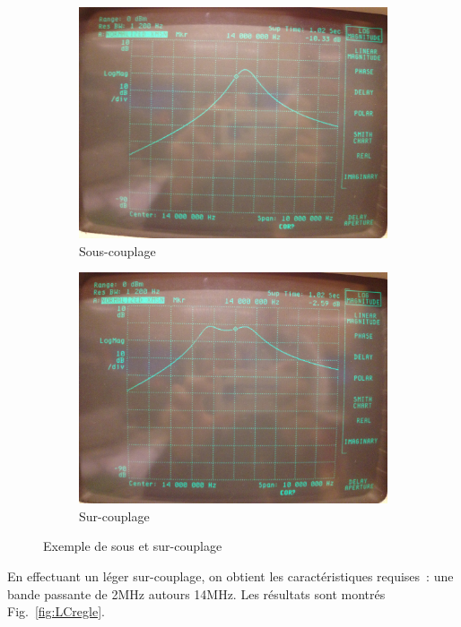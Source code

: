 \documentclass{article}
\begin{document}
\begin{figure}[h]
	\centering
	\begin{subfigure}[b]{0.43\textwidth}
		\centering
		\includegraphics[width=\textwidth]{souscouple}
		\caption{Sous-couplage}
	\end{subfigure}
	\hfill
	\begin{subfigure}[b]{0.43\textwidth}
		\centering
		\includegraphics[width=\textwidth]{surcouple}
		\caption{Sur-couplage}
	\end{subfigure}
	\caption{Exemple de sous et sur-couplage}
	\label{fig:sur_sous_couple}
\end{figure}

En effectuant un léger sur-couplage, on obtient les caractéristiques requises~: une bande passante de 2MHz autours 14MHz. Les résultats sont montrés Fig.~\ref{fig:LCregle}.
\end{document}
